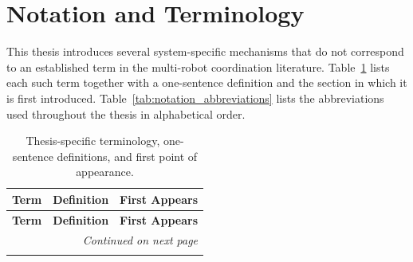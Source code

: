 \chapter*{Notation and Terminology}

This thesis introduces several system-specific mechanisms that do not correspond to an established term in the multi-robot coordination literature. Table~\ref{tab:notation_terminology} lists each such term together with a one-sentence definition and the section in which it is first introduced. Table~\ref{tab:notation_abbreviations} lists the abbreviations used throughout the thesis in alphabetical order.

\begin{longtable}{@{}p{}p{}p{}@{}}
\caption{Thesis-specific terminology, one-sentence definitions, and first point of appearance.}
\label{tab:notation_terminology} \\
\toprule
\textbf{Term} & \textbf{Definition} & \textbf{First Appears} \\
\midrule
\endfirsthead
\toprule
\textbf{Term} & \textbf{Definition} & \textbf{First Appears} \\
\midrule
\endhead
\midrule
\multicolumn{3}{r}{\textit{Continued on next page}} \\
\endfoot
\bottomrule
\endlastfoot


\end{longtable}
